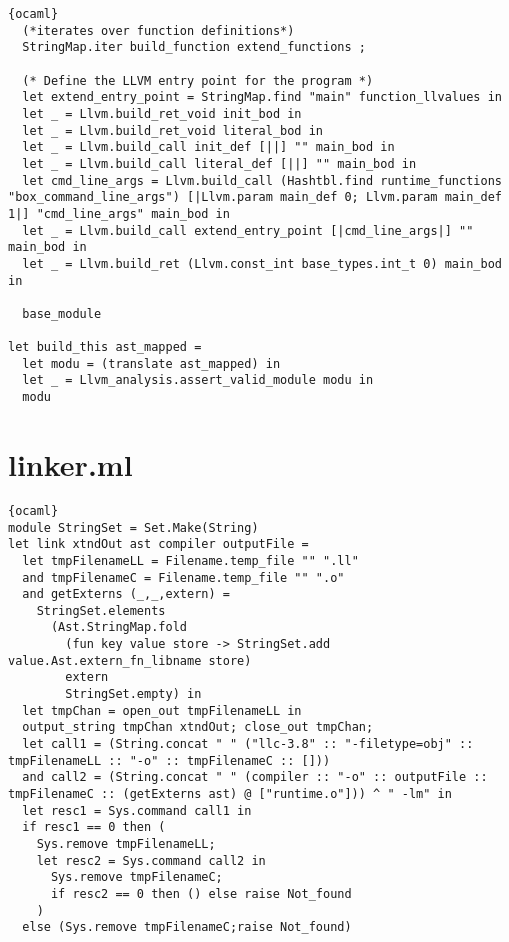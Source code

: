 \begin{lstlisting}{ocaml}
  (*iterates over function definitions*)
  StringMap.iter build_function extend_functions ;

  (* Define the LLVM entry point for the program *)
  let extend_entry_point = StringMap.find "main" function_llvalues in
  let _ = Llvm.build_ret_void init_bod in
  let _ = Llvm.build_ret_void literal_bod in
  let _ = Llvm.build_call init_def [||] "" main_bod in
  let _ = Llvm.build_call literal_def [||] "" main_bod in
  let cmd_line_args = Llvm.build_call (Hashtbl.find runtime_functions "box_command_line_args") [|Llvm.param main_def 0; Llvm.param main_def 1|] "cmd_line_args" main_bod in
  let _ = Llvm.build_call extend_entry_point [|cmd_line_args|] "" main_bod in
  let _ = Llvm.build_ret (Llvm.const_int base_types.int_t 0) main_bod in

  base_module

let build_this ast_mapped =
  let modu = (translate ast_mapped) in
  let _ = Llvm_analysis.assert_valid_module modu in
  modu
\end{lstlisting}
\section{linker.ml}
\begin{lstlisting}{ocaml}
module StringSet = Set.Make(String)
let link xtndOut ast compiler outputFile =
  let tmpFilenameLL = Filename.temp_file "" ".ll"
  and tmpFilenameC = Filename.temp_file "" ".o"
  and getExterns (_,_,extern) =
    StringSet.elements
      (Ast.StringMap.fold
        (fun key value store -> StringSet.add value.Ast.extern_fn_libname store)
        extern
        StringSet.empty) in
  let tmpChan = open_out tmpFilenameLL in
  output_string tmpChan xtndOut; close_out tmpChan;
  let call1 = (String.concat " " ("llc-3.8" :: "-filetype=obj" :: tmpFilenameLL :: "-o" :: tmpFilenameC :: []))
  and call2 = (String.concat " " (compiler :: "-o" :: outputFile :: tmpFilenameC :: (getExterns ast) @ ["runtime.o"])) ^ " -lm" in
  let resc1 = Sys.command call1 in
  if resc1 == 0 then (
    Sys.remove tmpFilenameLL;
    let resc2 = Sys.command call2 in
      Sys.remove tmpFilenameC;
      if resc2 == 0 then () else raise Not_found
    )
  else (Sys.remove tmpFilenameC;raise Not_found)
\end{lstlisting}
